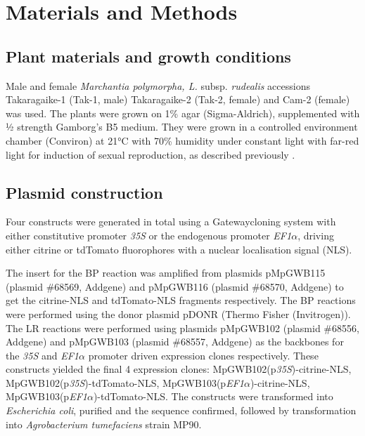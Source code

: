 \clearpage

\section{Materials and Methods}

\subsection{Plant materials and growth conditions}

Male and female \textit{Marchantia polymorpha, L.} subsp. \textit{rudealis} accessions Takaragaike-1 (Tak-1, male) Takaragaike-2 (Tak-2, female) and Cam-2 (female) was used. The plants were grown on 1\% agar (Sigma-Aldrich), supplemented with ½ strength Gamborg's B5 medium. They were grown in a controlled environment chamber (Conviron) at 21°C with 70\% humidity under constant light with far-red light for induction of sexual reproduction, as described previously \cite{RN212,RN254}.

\subsection{Plasmid construction}

Four constructs were generated in total  using a Gateway\textregistered cloning system with either constitutive promoter \textit{35S} or the endogenous promoter \textit{EF1$\alpha$}, driving either citrine or tdTomato fluorophores with a nuclear localisation signal (NLS).

The insert for the BP reaction was amplified from plasmids pMpGWB115 (plasmid \#68569, Addgene) and pMpGWB116 (plasmid \#68570, Addgene) \cite{RN72} to get the citrine-NLS and tdTomato-NLS fragments respectively. The BP reactions were performed using the donor plasmid pDONR (Thermo Fisher (Invitrogen)). The LR reactions were performed using plasmids pMpGWB102 (plasmid \#68556, Addgene) and pMpGWB103 (plasmid \#68557, Addgene)\cite{RN72} as the backbones for the \textit{35S} and \textit{EF1$\alpha$} promoter driven expression clones respectively. These constructs yielded the final 4 expression clones: MpGWB102(p\textit{35S})-citrine-NLS, MpGWB102(p\textit{35S})-tdTomato-NLS, MpGWB103(p\textit{EF1$\alpha$})-citrine-NLS, MpGWB103(p\textit{EF1$\alpha$})-tdTomato-NLS. The constructs were transformed into \textit{Escherichia  coli}, purified and the sequence confirmed, followed by transformation into \textit{Agrobacterium tumefaciens} strain MP90.

